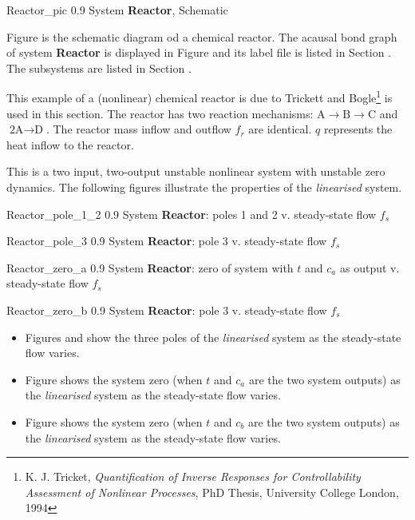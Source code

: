 

{Reactor_pic} {0.9} {System \textbf{Reactor}, Schematic}

Figure  is the schematic diagram od a chemical reactor.
The acausal bond graph of system \textbf{Reactor} is displayed in
Figure  and its label file is listed in
Section .  The subsystems are listed in Section
.

This example of a (nonlinear) chemical reactor is due to Trickett and
Bogle\footnote{ K. J. Tricket, \emph{Quantification of Inverse
    Responses for Controllability Assessment of Nonlinear Processes},
  PhD Thesis, University College London, 1994} is used in this
section.  The reactor has two reaction mechanisms: $\text{A}
\rightarrow \text{B} \rightarrow \text{C}$ and $\text{2A} \rightarrow
\text{D}$.  The reactor mass inflow and outflow $f_r$ are identical.
$q$ represents the heat inflow to the reactor.

This is a two input, two-output unstable nonlinear system with unstable zero
dynamics.
The following figures illustrate the properties of the
\emph{linearised} system.

{Reactor_pole_1_2} {0.9} {System \textbf{Reactor}: poles 1 and 2
  v. steady-state flow $f_s$}

{Reactor_pole_3} {0.9} {System \textbf{Reactor}: pole 3
  v. steady-state flow $f_s$}

{Reactor_zero_a} {0.9} {System \textbf{Reactor}: zero of system with
  $t$ and $c_a$ as output
  v. steady-state flow $f_s$}

{Reactor_zero_b} {0.9} {System \textbf{Reactor}: pole 3
  v. steady-state flow $f_s$}

\begin{itemize}
\item Figures  and
   show the three poles of the
  \emph{linearised} system as the steady-state flow varies. 
\item Figure  shows the system zero (when $t$ and
  $c_a$ are the two system outputs) as the
  \emph{linearised} system as the steady-state flow varies. 
\item Figure  shows the system zero (when $t$ and
  $c_b$ are the two system outputs) as the
  \emph{linearised} system as the steady-state flow varies. 
\end{itemize}
